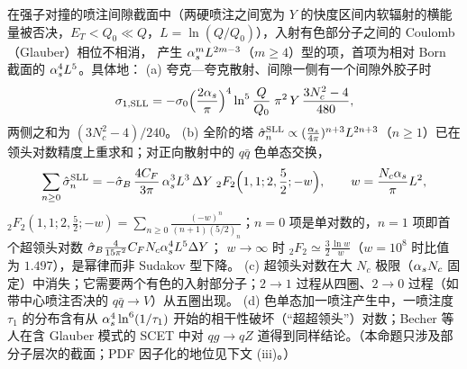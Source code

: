 \begin{proposition}\label{prop:jets-sll}
在强子对撞的喷注间隙截面中（两硬喷注之间宽为 $Y$ 的快度区间内软辐射的横能量被否决，$E_T<Q_0\ll Q$，$L=\ln(Q/Q_0)$），入射有色部分子之间的 Coulomb（Glauber）相位不相消，
产生 $\alpha_s^mL^{2m-3}$（$m\ge4$）型的项，首项为相对 Born 截面的 $\alpha_s^4L^5$\cite[式~(3.22)]{ForshawKyrieleisSeymour2006}。具体地：
(a) 夸克—夸克散射、间隙一侧有一个间隙外胶子时\cite[式~(3.24)]{ForshawKyrieleisSeymour2006}
\begin{equation}\label{eq:jets-sll-fks}
\sigma_{1,\rm SLL}=-\sigma_0\Big(\frac{2\alpha_s}{\pi}\Big)^4\ln^5\frac{Q}{Q_0}\;\pi^2\,Y\,\frac{3N_c^2-4}{480},
\end{equation}
两侧之和为 $(3N_c^2-4)/240$\cite[式~(2.22)]{Forshaw:2008cq}。
(b) 全阶的塔 $\hat\sigma_n^{\rm SLL}\propto(\frac{\alpha_s}{4\pi})^{n+3}L^{2n+3}$（$n\ge1$）已在领头对数精度上重求和\cite{Becher:2021zkk,Becher:2023mtx,Boer:2024hzh,Becher:2024nqc}；对正向散射中的 $q\bar q$ 色单态交换，
\begin{equation}\label{eq:jets-sll-bns}
\sum_{n\ge0}\hat\sigma_n^{\rm SLL}=-\hat\sigma_B\,\frac{4C_F}{3\pi}\,\alpha_s^3L^3\,\Delta Y\;{}_2F_2\Big(1,1;2,\frac52;-w\Big),\qquad w=\frac{N_c\alpha_s}{\pi}L^2,
\end{equation}
${}_2F_2(1,1;2,\frac52;-w)=\sum_{n\ge0}\frac{(-w)^n}{(n+1)(5/2)_n}$；$n=0$ 项是单对数的，$n=1$ 项即首个超领头对数 $\hat\sigma_B\frac{4}{15\pi^2}C_FN_c\alpha_s^4L^5\Delta Y$；
$w\to\infty$ 时 ${}_2F_2\simeq\frac32\frac{\ln w}{w}$（$w=10^8$ 时比值为 $1.497$），是幂律而非 Sudakov 型下降。
(c) 超领头对数在大 $N_c$ 极限（$\alpha_s N_c$ 固定）中消失；它需要两个有色的入射部分子；$2\to1$ 过程从四圈、$2\to0$ 过程（如带中心喷注否决的 $q\bar q\to V$）从五圈出现\cite{Becher:2021zkk}。
(d) 色单态加一喷注产生中，一喷注度 $\tau_1$ 的分布含有从 $\alpha_s^4\ln^6(1/\tau_1)$ 开始的相干性破坏（“超超领头”）对数\cite{Banfi:2025mra}；Becher 等人在含 Glauber 模式的 SCET 中对 $qg\to qZ$ 道得到同样结论\cite{Becher:2026kbr}。（本命题只涉及部分子层次的截面；PDF 因子化的地位见下文 (iii)。）
\end{proposition}

